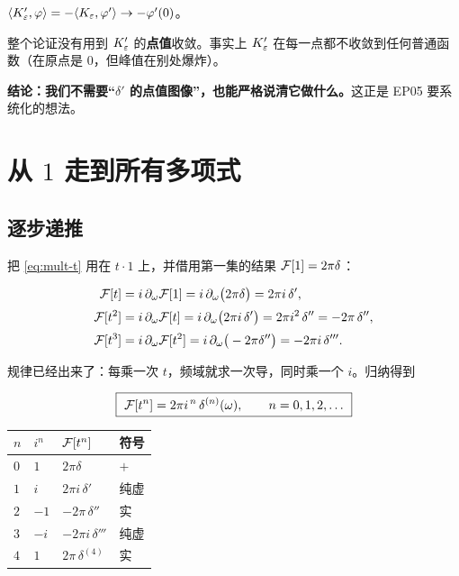 \begin{ideabox}
$\langle K_\varepsilon',\varphi\rangle=-\langle K_\varepsilon,\varphi'\rangle\to-\varphi'(0)$。

整个论证没有用到 $K_\varepsilon'$ 的\textbf{点值}收敛。事实上 $K_\varepsilon'$ 在每一点都不收敛到任何普通函数（在原点是 $0$，但峰值在别处爆炸）。

\textbf{结论：我们不需要“$\delta'$ 的点值图像”，也能严格说清它做什么。}这正是 EP05 要系统化的想法。
\end{ideabox}

\section{从 $1$ 走到所有多项式}

\subsection{逐步递推}

把 \eqref{eq:mult-t} 用在 $t\cdot1$ 上，并借用第一集的结果 $\mathcal{F}[1]=2\pi\delta$：

\begin{align}
\mathcal{F}[t]&=i\,\partial_\omega\mathcal{F}[1]=i\,\partial_\omega\big(2\pi\delta\big)=2\pi i\,\delta',\\[2pt]
\mathcal{F}[t^{2}]&=i\,\partial_\omega\mathcal{F}[t]=i\,\partial_\omega\big(2\pi i\,\delta'\big)=2\pi i^{2}\,\delta''=-2\pi\,\delta'',\\[2pt]
\mathcal{F}[t^{3}]&=i\,\partial_\omega\mathcal{F}[t^{2}]=i\,\partial_\omega\big(-2\pi\delta''\big)=-2\pi i\,\delta''' .
\end{align}

规律已经出来了：每乘一次 $t$，频域就求一次导，同时乘一个 $i$。归纳得到

\begin{equation}
\boxed{\ \F[t^{n}]=2\pi i^{\,n}\,\delta^{(n)}(\omega),\qquad n=0,1,2,\dots\ }\label{eq:tn}
\end{equation}

\begin{center}
\small
\renewcommand{\arraystretch}{1.4}
\begin{tabularx}{\textwidth}{@{}L{1.4cm}L{3.2cm}L{3.2cm}Y@{}}
\toprule
$n$ & $i^{n}$ & $\mathcal{F}[t^{n}]$ & 符号 \\
\midrule
$0$ & $1$ & $2\pi\delta$ & $+$ \\
$1$ & $i$ & $2\pi i\,\delta'$ & 纯虚 \\
$2$ & $-1$ & $-2\pi\,\delta''$ & 实 \\
$3$ & $-i$ & $-2\pi i\,\delta'''$ & 纯虚 \\
$4$ & $1$ & $2\pi\,\delta^{(4)}$ & 实 \\
\bottomrule
\end{tabularx}
\end{center}

